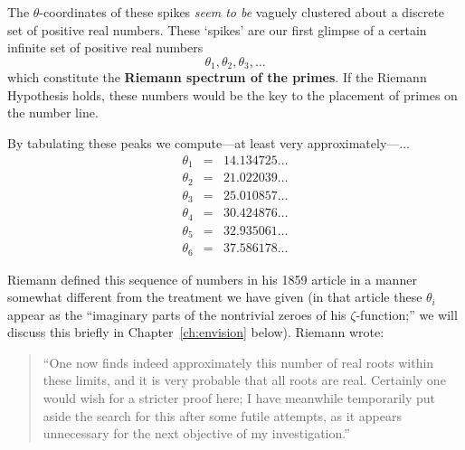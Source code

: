 \documentclass[openany]{book}
\newcommand{\ill}[3]{%
   \begin{figure}[H]%
   \vspace{-2ex}
   \centering%
   \texttt{[image: illustrations/\#1]}%
   \caption{#3}%
   \vspace{-2ex}
    \end{figure}}
\theoremstyle{plain}
\theoremstyle{definition}
\begin{document}





The $\theta$-coordinates of these spikes  {\it seem to be}
vaguely clustered about a discrete set of positive real numbers.
These `spikes' are our first glimpse of a
certain infinite set of positive real numbers
 $$\theta_1,\theta_2,\theta_3,\dots$$ which constitute the {\bf Riemann spectrum of
  the primes}. If the Riemann Hypothesis holds, these numbers would
be the key to the placement of primes on the number line.








By tabulating these peaks we compute---at least very approximately---$\dots$
\begin{eqnarray*}
\theta_1 &=& 14.134725 \dots\\
\theta_2 &=& 21.022039 \dots\\
\theta_3 &=& 25.010857 \dots\\
\theta_4 &=& 30.424876 \dots\\
\theta_5 &=& 32.935061 \dots\\
\theta_6 &=& 37.586178 \dots
\end{eqnarray*}

Riemann defined this sequence of numbers in his 1859 article in a
manner somewhat different from the treatment we have given (in that
article these $\theta_i$ appear as the ``imaginary parts of the
nontrivial zeroes of his $\zeta$-function;'' we will discuss this
briefly in Chapter~\ref{ch:envision} below). Riemann wrote:
 \begin{quote}
  ``One now finds indeed approximately this number of real roots
  within these limits, and it is very probable that all roots are
  real. Certainly one would wish for a stricter proof here; I have
  meanwhile temporarily put aside the search for this after some
  futile attempts, as it appears unnecessary for the next objective of
  my investigation.''
\end{quote}
\end{document}

